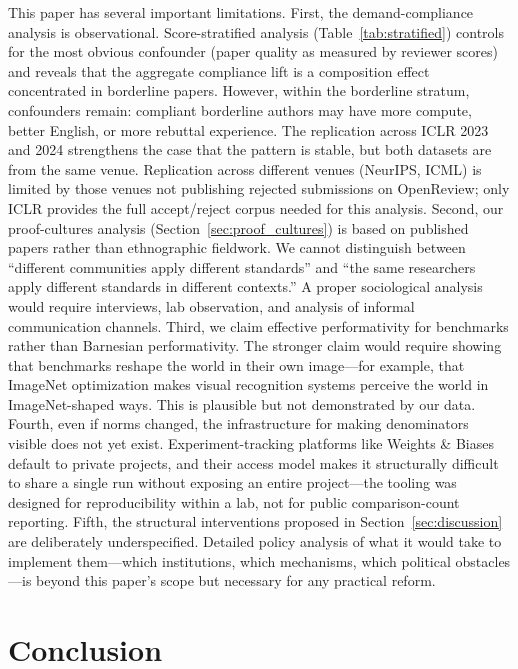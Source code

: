 \documentclass{article}
\begin{document}
This paper has several important limitations. First, the demand-compliance analysis is observational. Score-stratified analysis (Table~\ref{tab:stratified}) controls for the most obvious confounder (paper quality as measured by reviewer scores) and reveals that the aggregate compliance lift is a composition effect concentrated in borderline papers. However, within the borderline stratum, confounders remain: compliant borderline authors may have more compute, better English, or more rebuttal experience. The replication across ICLR 2023 and 2024 strengthens the case that the pattern is stable, but both datasets are from the same venue. Replication across different venues (NeurIPS, ICML) is limited by those venues not publishing rejected submissions on OpenReview; only ICLR provides the full accept/reject corpus needed for this analysis. Second, our proof-cultures analysis (Section~\ref{sec:proof_cultures}) is based on published papers rather than ethnographic fieldwork. We cannot distinguish between ``different communities apply different standards'' and ``the same researchers apply different standards in different contexts.'' A proper sociological analysis would require interviews, lab observation, and analysis of informal communication channels. Third, we claim effective performativity for benchmarks rather than Barnesian performativity. The stronger claim would require showing that benchmarks reshape the world in their own image---for example, that ImageNet optimization makes visual recognition systems perceive the world in ImageNet-shaped ways. This is plausible but not demonstrated by our data. Fourth, even if norms changed, the infrastructure for making denominators visible does not yet exist. Experiment-tracking platforms like Weights \& Biases default to private projects, and their access model makes it structurally difficult to share a single run without exposing an entire project---the tooling was designed for reproducibility within a lab, not for public comparison-count reporting. Fifth, the structural interventions proposed in Section~\ref{sec:discussion} are deliberately underspecified. Detailed policy analysis of what it would take to implement them---which institutions, which mechanisms, which political obstacles---is beyond this paper's scope but necessary for any practical reform.

\section{Conclusion}
\end{document}
